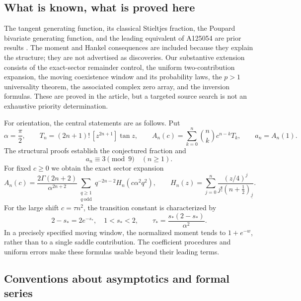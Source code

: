 \documentclass[11pt]{article}
\theoremstyle{definition}
\theoremstyle{remark}
\newcommand{\fall}[2]{(#1)_{\underline{#2}}}
\begin{document}
\subsection{What is known, what is proved here}

The tangent generating function, its classical Stieltjes fraction, the
Poupard bivariate generating function, and the leading equivalent of
A125054 are prior results \cite{bala,foatahan,oeis125054}.  The moment and
Hankel consequences are included because they explain the structure; they
are not advertised as discoveries.  Our substantive extension consists of
the exact-sector remainder control, the uniform two-contribution expansion,
the moving coexistence window and its probability laws, the $p>1$
universality theorem, the associated complex zero array, and the inversion
formulas.
These are proved in the article, but a targeted source search is not an
exhaustive priority determination.

For orientation, the central statements are as follows.  Put
\begin{equation}\label{pou:eq:definition}
 \alpha=\frac\pi2,\qquad
 T_n=(2n+1)!\,[z^{2n+1}]\tan z,\qquad
 A_n(c)=\sum_{k=0}^n\binom nk c^{n-k}T_k,\qquad a_n=A_n(1).
\end{equation}
The structural proofs establish the conjectured fraction and
\begin{equation}\label{pou:eq:congruenceintro}
 a_n\equiv3\pmod9\quad(n\ge1).
\end{equation}
For fixed $c\ge0$ we obtain the exact sector expansion
\begin{equation}\label{pou:eq:sectorintro}
 A_n(c)=\frac{2\Gamma(2n+2)}{\alpha^{2n+2}}
 \sum_{\substack{q\ge1\\q\ \mathrm{odd}}}
 q^{-2n-2}H_n(c\alpha^2q^2),\qquad
 H_n(z)=\sum_{j=0}^n\frac{(z/4)^j}{j!\fall{n+\tfrac12}{j}}.
\end{equation}
For the large shift $c=\tau n^2$, the transition constant is characterized by
\begin{equation}\label{pou:eq:starintro}
 2-s_*=2e^{-s_*},\quad 1<s_*<2,\qquad
 \tau_* =\frac{s_*(2-s_*)}{\alpha^2}.
\end{equation}
In a precisely specified moving window, the normalized moment tends to
$1+e^{-w}$, rather than to a single saddle contribution.
The coefficient procedures and uniform errors make these formulas usable
beyond their leading terms.

\subsection{Conventions about asymptotics and formal series}
\end{document}
